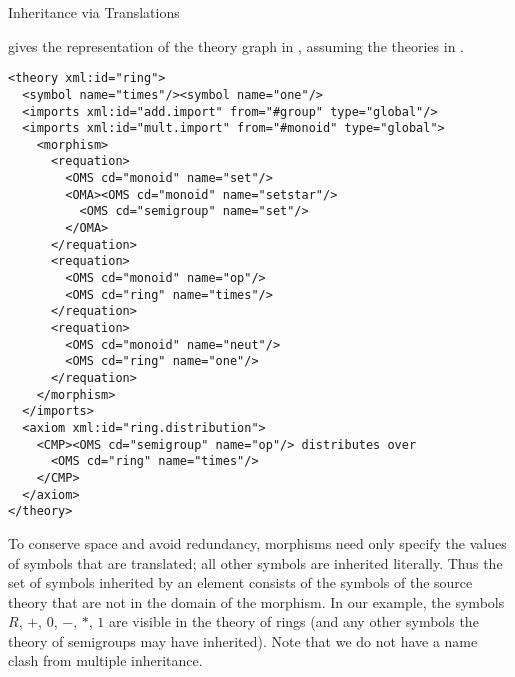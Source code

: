 \begin{omgroup}[id=complex-theories,short=Complex Theories,
                            creators=miko,contributors=frabe]
\begin{omgroup}[id=morphisms]{Inheritance via Translations}
\begin{module}[id=morphisms]
{} gives the {\omdoc} representation of the theory graph in
{}, assuming the theories in {}.

\begin{lstlisting}[label=lst:rings,
  caption={A Theory of Rings by Inheritance Via Renaming},
  index={derive,method,premise}]
<theory xml:id="ring"> 
  <symbol name="times"/><symbol name="one"/> 
  <imports xml:id="add.import" from="#group" type="global"/>
  <imports xml:id="mult.import" from="#monoid" type="global"> 
    <morphism> 
      <requation> 
        <OMS cd="monoid" name="set"/>
        <OMA><OMS cd="monoid" name="setstar"/>
          <OMS cd="semigroup" name="set"/>
        </OMA>
      </requation> 
      <requation> 
        <OMS cd="monoid" name="op"/>
        <OMS cd="ring" name="times"/>
      </requation> 
      <requation>
        <OMS cd="monoid" name="neut"/>
        <OMS cd="ring" name="one"/>
      </requation> 
    </morphism> 
  </imports> 
  <axiom xml:id="ring.distribution"> 
    <CMP><OMS cd="semigroup" name="op"/> distributes over 
      <OMS cd="ring" name="times"/> 
    </CMP> 
  </axiom>
</theory>
\end{lstlisting}

To conserve space and avoid redundancy, {\omdoc} morphisms need only specify the values of
symbols that are translated; all other symbols are inherited literally.  Thus the set of
symbols inherited by an {} element consists of the symbols of the source
theory that are not in the domain of the morphism. In our example, the symbols $R$, $+$,
$0$, $-$, $*$, $1$ are visible in the theory of rings (and any other symbols the theory of
semigroups may have inherited). Note that we do not have a name clash from multiple
inheritance.
  

\end{module}
\end{omgroup}
\end{omgroup}
